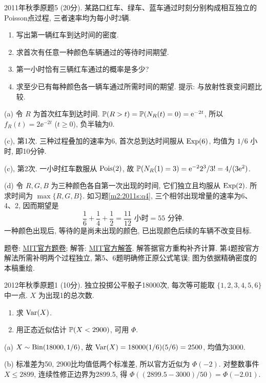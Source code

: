 \begin{exercise}\label{m2:2011f:q5}
2011年秋季原题5 (20分). 某路口红车、绿车、蓝车通过时刻分别构成相互独立的Poisson点过程, 三者速率均为每小时2辆.
\begin{enumerate}
\item[(a)]\label{m2:2011f:q5:a} 写出第一辆红车到达时间的密度.
\item[(c), 第1次]\label{m2:2011f:q5:c1} 求首次有任意一种颜色车辆通过的等待时间期望.
\item[(c), 第2次]\label{m2:2011f:q5:c2} 第一小时恰有三辆红车通过的概率是多少?
\item[(d)]\label{m2:2011f:q5:d} 求至少已有每种颜色各一辆车通过所需时间的期望. 提示: 与放射性衰变问题比较.
\end{enumerate}
\end{exercise}
\begin{solution}
(a) 令 $R$ 为首次红车到达时间. $\mathbb P(R>t)=\mathbb P(N_R(t)=0)=\mathrm e^{-2t}$, 所以 $f_R(t)=2\ee^{-2t}$ ($t\ge0$), 负半轴为0.

(c), 第1次. 三种过程叠加的速率为6, 首次总到达时间服从 $\operatorname{Exp}(6)$, 均值为 $1/6$ 小时, 即10分钟.

(c), 第2次. 一小时红车数服从 $\operatorname{Pois}(2)$, 故 $\mathbb P(N_R(1)=3)=\mathrm e^{-2}2^3/3!=4/(3\mathrm e^2)$.

(d) 令 $R,G,B$ 为三种颜色各自第一次出现的时间, 它们独立且均服从 $\operatorname{Exp}(2)$. 所求时间为 $\max\{R,G,B\}$. 如习题\ref{m2:2011s:q4}, 三个相邻出现增量的速率为6、4、2, 因而期望是
\[
\frac16+\frac14+\frac12=\frac{11}{12}\text{ 小时}=55\text{ 分钟}.
\]
一种颜色出现后, 等待的是尚未出现的颜色, 已出现颜色后续的车辆不改变目标.
\end{solution}

题卷: \href{https://ocw.mit.edu/courses/18-600-probability-and-random-variables-fall-2019/resources/mit18_600f19_mid2_2012/}{MIT官方题卷}; 解答: \href{https://ocw.mit.edu/courses/18-600-probability-and-random-variables-fall-2019/resources/mit18_600f19_mid2_2012_soln/}{MIT官方解答}. 解答据官方重构补齐计算. 第4题按官方解法所需补明两个过程独立, 第5、6题明确修正原公式笔误; 图为依据精确密度的本稿重绘.

\begin{exercise}\label{m2:2012f:q1}
2012年秋季原题1 (10分). 独立投掷公平骰子18000次, 每次等可能取 $\{1,2,3,4,5,6\}$ 中一点. $X$ 为出现1的总次数.
\begin{enumerate}
\item[(a)]\label{m2:2012f:q1:a} 求 $\operatorname{Var}(X)$.
\item[(b)]\label{m2:2012f:q1:b} 用正态近似估计 $\mathbb P(X<2900)$, 可用 $\Phi$.
\end{enumerate}
\end{exercise}
\begin{solution}
(a) $X\sim\operatorname{Bin}(18000,1/6)$, 故 $\operatorname{Var}(X)=18000(1/6)(5/6)=2500$, 均值为3000.

(b) 标准差为50, 2900比均值低两个标准差, 所以官方近似为 $\Phi(-2)$. 对整数事件 $X\le2899$, 连续性修正边界为2899.5, 得 $\Phi((2899.5-3000)/50)=\Phi(-2.01)$.
\end{solution}

